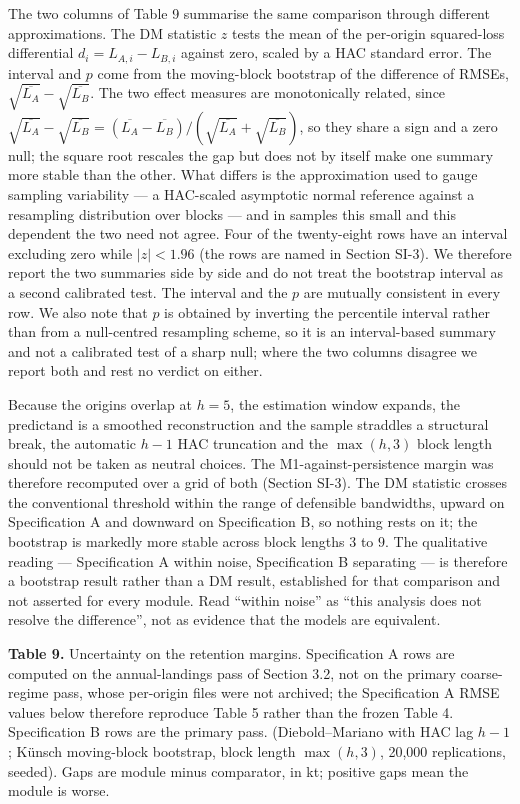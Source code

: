 \documentclass[11pt]{article}
\begin{document}
The two columns of Table 9 summarise the same comparison through
different approximations. The DM statistic \(z\) tests the mean of the
per-origin squared-loss differential \(d_i = L_{A,i} - L_{B,i}\) against
zero, scaled by a HAC standard error. The interval and \(p\) come from
the moving-block bootstrap of the difference of RMSEs,
\(\sqrt{\overline{L_A}} - \sqrt{\overline{L_B}}\). The two effect
measures are monotonically related, since
\(\sqrt{\overline{L_A}}-\sqrt{\overline{L_B}} =
(\overline{L_A}-\overline{L_B})/(\sqrt{\overline{L_A}}+
\sqrt{\overline{L_B}})\), so they share a sign and a zero null; the
square root rescales the gap but does not by itself make one summary
more stable than the other. What differs is the approximation used to
gauge sampling variability --- a HAC-scaled asymptotic normal reference
against a resampling distribution over blocks --- and in samples this
small and this dependent the two need not agree. Four of the
twenty-eight rows have an interval excluding zero while \(|z| < 1.96\)
(the rows are named in Section SI-3). We therefore report the two
summaries side by side
and do not treat the bootstrap interval as a second calibrated test. The interval and the \(p\) are mutually
consistent in every row. We also note that \(p\) is obtained by
inverting the percentile interval rather than from a null-centred
resampling scheme, so it is an interval-based summary and not a
calibrated test of a sharp null; where the two columns disagree we
report both and rest no verdict on either.

Because the origins overlap at \(h=5\), the estimation window expands,
the predictand is a smoothed reconstruction and the sample straddles a
structural break, the automatic \(h-1\) HAC truncation and the
\(\max(h,3)\) block length should not be taken as neutral choices. The
M1-against-persistence margin was therefore recomputed over a grid of
both (Section SI-3). The DM statistic crosses the conventional
threshold within the range of defensible bandwidths, upward on
Specification A and downward on Specification B, so nothing rests on it;
the bootstrap is markedly more stable across block lengths \(3\) to
\(9\). The qualitative reading --- Specification A within noise,
Specification B separating --- is therefore a bootstrap result rather
than a DM result, established for that comparison and not asserted for
every module. Read
``within noise'' as ``this analysis does not resolve the difference'',
not as evidence that the models are equivalent.

\textbf{Table 9.} Uncertainty on the retention margins. Specification A
rows are computed on the annual-landings pass of Section 3.2, not on the
primary coarse-regime pass, whose per-origin files were not archived;
the Specification A RMSE values below therefore reproduce Table 5 rather
than the frozen Table 4. Specification B rows are the primary pass.
(Diebold--Mariano with HAC lag \(h-1\); K\"unsch moving-block
bootstrap, block length \(\max(h,3)\), 20,000 replications, seeded).
Gaps are module minus comparator, in kt; positive gaps mean the module
is worse.
\end{document}
